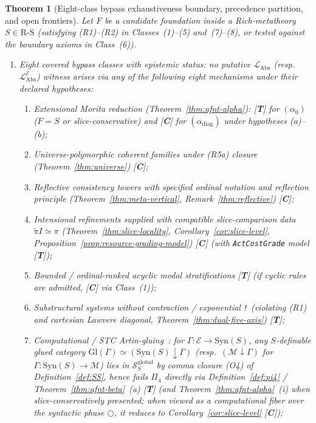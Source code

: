 \documentclass[11pt]{article}
\theoremstyle{plain}
\newtheorem{theorem}{Theorem}[section]
\theoremstyle{definition}
\newcommand{\RS}{\mathrm{R\text{-}S}}
\newcommand{\cS}{\mathcal{S}}
\newcommand{\LAbs}{\mathcal{L}_{\mathrm{Abs}}}
\newcommand{\Syn}{\mathrm{Syn}}
\newcommand{\tpi}{\widetilde{\pi}}
\newcommand{\cE}{\mathcal{E}}
\newcommand{\LAbsE}{\LAbs^{\cE}}
\begin{document}
\begin{theorem}[Eight-class bypass exhaustiveness boundary, precedence partition, and open frontiers]\label{thm:q3-exhaustiveness-boundary}
Let $F$ be a candidate foundation inside a Rich-metatheory $S \in \RS$ (satisfying (R1)--(R2) in Classes~(1)--(5) and~(7)--(8), or tested against the boundary axioms in Class~(6)).
\begin{enumerate}[nosep,label=(\roman*)]
\item \emph{Eight covered bypass classes with epistemic status}: no putative $\LAbs$ (resp.\ $\LAbsE$) witness arises via any of the following eight mechanisms under their declared hypotheses:
  \begin{enumerate}[nosep,label=(\arabic*)]
  \item \emph{Extensional Morita reduction} (Theorem~\ref{thm:afnt-alpha}): \textup{[\textbf{T}]} for $(\alpha_0)$ ($F = S$ or slice-conservative) and \textup{[\textbf{C}]} for $(\alpha_{\mathrm{diag}})$ under hypotheses (a)--(b);
  \item \emph{Universe-polymorphic coherent families} under (R5a) closure (Theorem~\ref{thm:universe}) \textup{[\textbf{C}]};
  \item \emph{Reflective consistency towers} with specified ordinal notation and reflection principle (Theorem~\ref{thm:meta-vertical}, Remark~\ref{thm:reflective}) \textup{[\textbf{C}]};
  \item \emph{Intensional refinements} supplied with compatible slice-comparison data $\tpi I \simeq \pi$ (Theorem~\ref{thm:slice-locality}, Corollary~\ref{cor:slice-level}, Proposition~\ref{prop:resource-grading-model}) \textup{[\textbf{C}]} (with \texttt{ActCostGrade} model \textup{[\textbf{T}]});
  \item \emph{Bounded / ordinal-ranked acyclic modal stratifications} \textup{[\textbf{T}]} (if cyclic rules are admitted, \textup{[\textbf{C}]} via Class~(1));
  \item \emph{Substructural systems without contraction / exponential \texttt{!}} (violating (R1) and cartesian Lawvere diagonal, Theorem~\ref{thm:dual-five-axis}) \textup{[\textbf{T}]};
  \item \emph{Computational / STC Artin-gluing}~\cite{Sterling2021}: for $\Gamma : \mathcal{E} \to \Syn(S)$, any $S$-definable glued category $\mathrm{Gl}(\Gamma) \simeq (\Syn(S)\downarrow \Gamma)$ (resp.\ $(\mathcal{M}\downarrow\Gamma)$ for $\Gamma : \Syn(S)\to\mathcal{M}$) lies in $\cS_S^{\mathrm{global}}$ by comma closure (O4) of Definition~\ref{def:SS}, hence fails $\Pi_4$ directly via Definition~\ref{def:pi4} / Theorem~\ref{thm:afnt-beta}~(a) \textup{[\textbf{T}]} (and Theorem~\ref{thm:afnt-alpha}~(i) when slice-conservatively presented; when viewed as a computational fiber over the syntactic phase $\bigcirc$, it reduces to Corollary~\ref{cor:slice-level} \textup{[\textbf{C}]});

\end{enumerate}
\end{enumerate}
\end{theorem}
\end{document}
